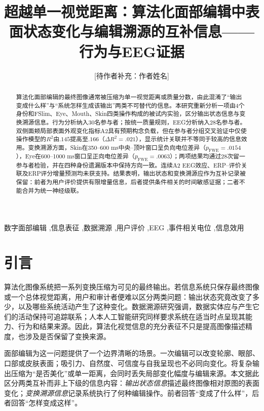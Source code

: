 \documentclass[preprint,12pt,authoryear]{elsarticle}
\newcommand{\todo}[1]{\textcolor{red!70!black}{[待作者补充：#1]}}
\newcommand{\pfwe}{p_{\mathrm{FWE}}}
\begin{document}
\begin{frontmatter}

\title{超越单一视觉距离：算法化面部编辑中表面状态变化与编辑溯源的互补信息——行为与EEG证据}

\author[aff1]{\todo{作者姓名}}
\address[aff1]{\todo{作者单位、城市、国家及通讯邮箱}}

\begin{abstract}
算法化面部编辑的最终图像通常被压缩为单一视觉距离或质量分数，由此混淆了“输出变成什么样”与“系统怎样生成该输出”两类不可替代的信息。本研究重新分析一项由4个身份和FSlim、Eye、Mouth、Skin四类操作构成的被试内实验，区分输出状态信息与变换溯源信息。行为分析纳入30名参与者；按统一质量规则，EEG分析纳入28名参与者。双侧面颊局部表面外观变化指标A2具有预期构念负载，但在参与者分组交叉验证中仅使操作模型的$R^2$由$.145$提高至$.166$（$\Delta R^2=.021$），显示统计关联并不等同于较高的信息效用。变换溯源方面，Skin在350--600 ms中央--顶叶窗口呈负向电位差异（$\pfwe=.0154$），Eye在600--1000 ms窗口呈正向电位差异（$\pfwe=.0063$）；两项结果均通过28次留一参与者检验，并在四种身份遗漏版本中保持方向一致。连续A2 EEG效应、ERP--评价关联及ERP评分增量预测均未获支持。结果表明，输出状态和变换溯源应作为互补记录被保留：前者为用户评价提供有限增量信息，后者提供条件相关的时间敏感证据；二者不能合并为统一神经级联。
\end{abstract}

\begin{keyword}
数字面部编辑 \sep 信息表征 \sep 数据溯源 \sep 用户评价 \sep EEG \sep 事件相关电位 \sep 信息效用
\end{keyword}

\end{frontmatter}

\section{引言}

算法化图像系统把一系列变换压缩为可见的最终输出。若信息系统只保存最终图像或一个总体视觉距离，用户和审计者便难以区分两类问题：输出状态究竟改变了多少，以及哪些系统活动产生了这种变化。数据溯源研究强调，数据实体应与产生它们的活动保持可追踪联系；人本人工智能研究同样要求系统在适当时点呈现其能力、行为和结果来源\citep{MoreauMissier2013,Simmhan2005,Amershi2019,Miller2019}。因此，算法化视觉信息的充分表征不只是提高图像描述精度，也涉及是否保留了变换来源。

面部编辑为这一问题提供了一个边界清晰的场景。一次编辑可以改变轮廓、眼部、口部或皮肤表面；吸引力、自然度、可信度与自我呈现也不必同向变化\citep{Appel2023,Hong2020,Javornik2022,Dijkslag2024}。将复杂输出压缩为“是否美化”或单一距离，会同时丢失局部变化幅度与编辑来源。本文据此区分两类互补而非上下级的信息内容：\emph{输出状态信息}描述最终图像相对原图的表面变化；\emph{变换溯源信息}记录系统执行了何种编辑操作。前者回答“变成了什么样”，后者回答“怎样变成这样”。
\end{document}
